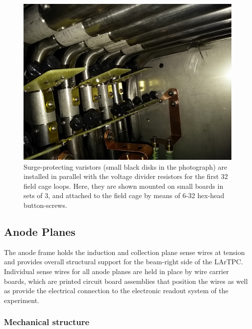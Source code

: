 \begin{figure}
\centering	
\includegraphics[width=0.8\linewidth]{figures/tpc-voltage-divider-varistors.jpg}
\caption{Surge-protecting varistors (small black disks in the photograph) are installed in parallel with the voltage divider resistors for the first 32 field cage loops. Here, they are shown mounted on small boards in sets of 3, and attached to the field cage by means of 6-32 hex-head button-screws.}
\label{fig:tpc-voltage-divider-varistors}
\end{figure}





\subsection{Anode Planes}

The anode frame holds the induction and collection plane sense wires at tension and provides overall structural support for the beam-right side of the LArTPC.  Individual sense wires for all anode planes are held in place by wire carrier boards, which are printed circuit board assemblies that position the wires as well as provide the electrical connection to the electronic readout system of the experiment.

\subsubsection{Mechanical structure}


